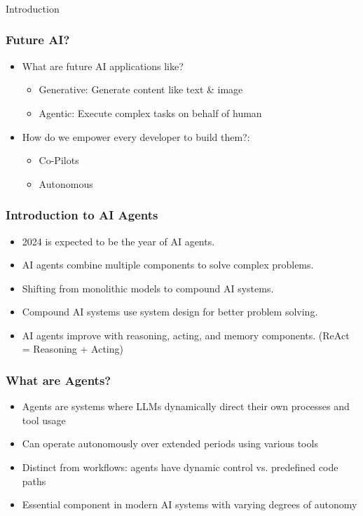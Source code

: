 \begin{frame}[fragile]\frametitle{}
\begin{center}
{\Large Introduction}
\end{center}
\end{frame}

\begin{frame}[fragile]\frametitle{Future AI?}
  \begin{itemize}
    \item What are future AI applications like?
	\begin{itemize}
		\item Generative: Generate content like text \& image
		\item Agentic: Execute complex tasks on behalf of human
	 \end{itemize}
	\item How do we empower every developer to build them?: 
	\begin{itemize}
		\item Co-Pilots
		\item Autonomous
	 \end{itemize}	
  \end{itemize}
\end{frame}

\begin{frame}[fragile]\frametitle{Introduction to AI Agents}
    \begin{itemize}
        \item 2024 is expected to be the year of AI agents.
        \item AI agents combine multiple components to solve complex problems.
        \item Shifting from monolithic models to compound AI systems.
        \item Compound AI systems use system design for better problem solving.
        \item AI agents improve with reasoning, acting, and memory components. (ReAct = Reasoning + Acting)
    \end{itemize}
\end{frame}

\begin{frame}[fragile]\frametitle{What are Agents?}
    \begin{itemize}
        \item Agents are systems where LLMs dynamically direct their own processes and tool usage
        \item Can operate autonomously over extended periods using various tools
        \item Distinct from workflows: agents have dynamic control vs. predefined code paths
        \item Essential component in modern AI systems with varying degrees of autonomy
    \end{itemize}
\end{frame}

